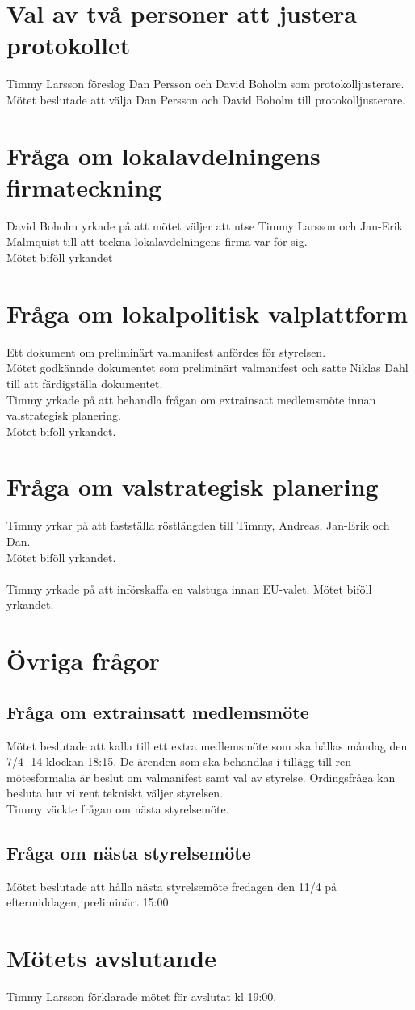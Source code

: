 \documentclass[a4paper,10pt]{article}
\begin{document}
\section{Val av två personer att justera protokollet}
Timmy Larsson föreslog Dan Persson och David Boholm som protokolljusterare. \\
Mötet beslutade att välja Dan Persson och David Boholm till protokolljusterare.

\section{Fråga om lokalavdelningens firmateckning}
David Boholm yrkade på att mötet väljer att utse Timmy Larsson och Jan-Erik Malmquist till att teckna lokalavdelningens firma var för sig.\\
Mötet biföll yrkandet
\section{Fråga om lokalpolitisk valplattform}
Ett dokument om preliminärt valmanifest anfördes för styrelsen.\\
Mötet godkännde dokumentet som preliminärt valmanifest och satte Niklas Dahl till att färdigställa dokumentet.\\
Timmy yrkade på att behandla frågan om extrainsatt medlemsmöte innan valstrategisk planering.\\
Mötet biföll yrkandet.
\section{Fråga om valstrategisk planering}
Timmy yrkar på att fastställa röstlängden till Timmy, Andreas, Jan-Erik och Dan.\\
Mötet biföll yrkandet.\\ \\
Timmy yrkade på att införskaffa en valstuga innan EU-valet.
Mötet biföll yrkandet.
\section{Övriga frågor}
\subsection*{Fråga om extrainsatt medlemsmöte}
Mötet beslutade att kalla till ett extra medlemsmöte som ska hållas måndag den 7/4 -14 klockan 18:15. De ärenden som ska behandlas i tillägg till ren mötesformalia är beslut om valmanifest samt val av styrelse. Ordingsfråga kan besluta hur vi rent tekniskt väljer styrelsen. \\
Timmy väckte frågan om nästa styrelsemöte.
\subsection*{Fråga om nästa styrelsemöte}
Mötet beslutade att hålla nästa styrelsemöte fredagen den 11/4 på eftermiddagen, preliminärt 15:00
\section{Mötets avslutande}
Timmy Larsson förklarade mötet för avslutat kl 19:00.
\end{document}
